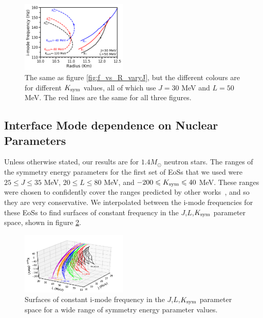 \documentclass[fleqn,usenatbib]{mnras}
\begin{document}
\begin{figure}
\centering
\includegraphics[width=0.45\textwidth,angle=0]{f_Rcc_Rstar_K_grid.png}
\caption{The same as figure \ref{fig:f_vs_R_varyJ}, but the different colours are for different $K_{\rm sym}$ values, all of which use $J=30$ MeV and $L=50$ MeV. The red lines are the same for all three figures.}
\label{fig:f_vs_R_varyK}
\end{figure}
















\subsection{Interface Mode dependence on Nuclear Parameters}
\hspace{\parindent}Unless otherwise stated, our results are for $1.4M_{\odot}$ neutron stars. The ranges of the symmetry energy parameters for the first set of EoSs that we used were $25\leq J\leq 35$ MeV, $20\leq L\leq 80$ MeV, and $-200\leq K_{\rm sym}\leq 40$ MeV. These ranges were chosen to confidently cover the ranges predicted by other works~\cite{liu2010nuclear,tsang2012constraints,lattimer2013constraining,balantekin2014nuclear}, and so they are very conservative. We interpolated between the i-mode frequencies for these EoSs to find surfaces of constant frequency in the $J$,$L$,$K_{\rm sym}$ parameter space, shown in figure \ref{fig:grid_J_L_K}. 




\begin{figure}
\centering
\includegraphics[width=0.45\textwidth,angle=0]{grid_J_L_K.png}
\caption{Surfaces of constant i-mode frequency in the $J$,$L$,$K_{\rm sym}$ parameter space for a wide range of symmetry energy parameter values.}
\label{fig:grid_J_L_K}
\end{figure}
\end{document}
